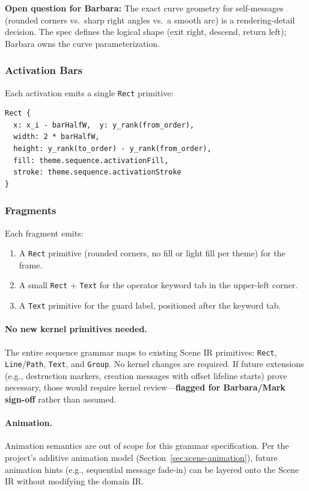 \textbf{Open question for Barbara:} The exact curve geometry for self-messages (rounded corners vs.\ sharp right angles vs.\ a smooth arc) is a rendering-detail decision. The spec defines the logical shape (exit right, descend, return left); Barbara owns the curve parameterization.

\subsubsection{Activation Bars}

Each activation emits a single \texttt{Rect} primitive:
\begin{Verbatim}[frame=single,fontsize=\small]
Rect {
  x: x_i - barHalfW,  y: y_rank(from_order),
  width: 2 * barHalfW,
  height: y_rank(to_order) - y_rank(from_order),
  fill: theme.sequence.activationFill,
  stroke: theme.sequence.activationStroke
}
\end{Verbatim}

\subsubsection{Fragments}

Each fragment emits:
\begin{enumerate}
  \item A \texttt{Rect} primitive (rounded corners, no fill or light fill per theme) for the frame.
  \item A small \texttt{Rect} + \texttt{Text} for the operator keyword tab in the upper-left corner.
  \item A \texttt{Text} primitive for the guard label, positioned after the keyword tab.
\end{enumerate}

\paragraph{No new kernel primitives needed.}
The entire sequence grammar maps to existing Scene IR primitives: \texttt{Rect}, \texttt{Line}/\texttt{Path}, \texttt{Text}, and \texttt{Group}. No kernel changes are required. If future extensions (e.g., destruction markers, creation messages with offset lifeline starts) prove necessary, those would require kernel review---\textbf{flagged for Barbara/Mark sign-off} rather than assumed.

\paragraph{Animation.}
Animation semantics are out of scope for this grammar specification. Per the project's additive animation model (Section~\ref{sec:scene-animation}), future animation hints (e.g., sequential message fade-in) can be layered onto the Scene IR without modifying the domain IR.

